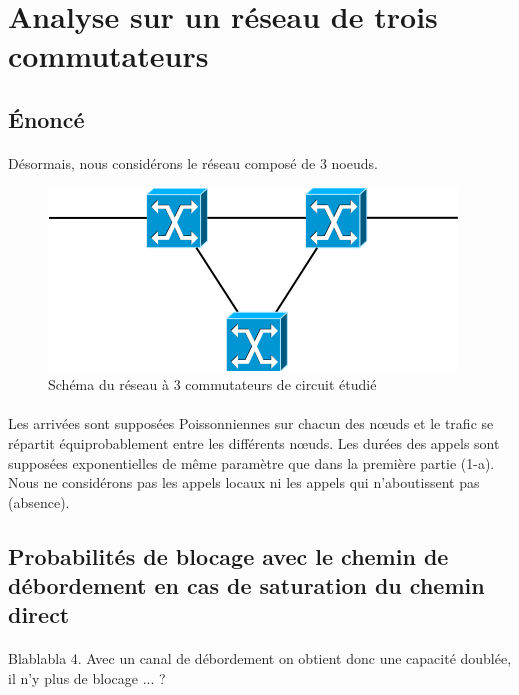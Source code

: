     \section{Analyse sur un réseau de trois commutateurs}
%
        \subsection{Énoncé}
%
            \paragraph{}
Désormais, nous considérons le réseau composé de 3 noeuds.
%
            \begin{figure}[h]
                \centering
                \includegraphics[scale=0.6]{RSC/1-2.png}
                \caption{ Schéma du réseau à 3 commutateurs de circuit étudié }
                \label{ Schema du reseau a 3 commutateurs de circuit }
            \end{figure}
%
            \paragraph{}
Les arrivées sont supposées Poissonniennes sur chacun des nœuds et le trafic se répartit équiprobablement entre les différents nœuds.
Les durées des appels sont supposées exponentielles de même paramètre que dans la première partie (1-a).
Nous ne considérons pas les appels locaux ni les appels qui n'aboutissent pas (absence).
%
%
    \clearpage
%
%
        \subsection{Probabilités de blocage avec le chemin de débordement en cas de saturation du chemin direct}
%
            \paragraph{}
Blablabla 4.
Avec un canal de débordement on obtient donc une capacité doublée, il n'y plus de blocage ... ?
%
